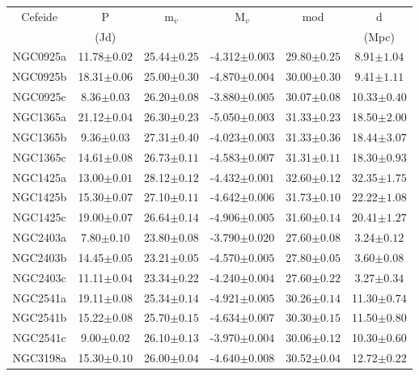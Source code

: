 \documentclass{article}
\numberwithin{equation}{subsection}
\begin{document}
\newpage
{}
\vspace*{\fill}
\begin{table}[h]
\begin{tabular}{cccccc}
\hline\hline
Cefeide  & P          & m$_v$          & M$_v$            & mod            & d        \\ 
 & (Jd) & & & & (Mpc) \\
 \hline
NGC0925a & 11.78$\pm0.02$ & 25.44$\pm0.25$ & -4.312$\pm0.003$ & 29.80$\pm0.25$ & 8.91$\pm1.04$  \\
NGC0925b & 18.31$\pm0.06$ & 25.00$\pm0.30$ & -4.870$\pm0.004$ & 30.00$\pm0.30$ & 9.41$\pm1.11$  \\
NGC0925c & 8.36$\pm0.03$  & 26.20$\pm0.08$ & -3.880$\pm0.005$ & 30.07$\pm0.08$ & 10.33$\pm0.40$ \\
NGC1365a & 21.12$\pm0.04$ & 26.30$\pm0.23$ & -5.050$\pm0.003$ & 31.33$\pm0.23$ & 18.50$\pm2.00$ \\
NGC1365b & 9.36$\pm0.03$  & 27.31$\pm0.40$ & -4.023$\pm0.003$ & 31.33$\pm0.36$ & 18.44$\pm3.07$ \\
NGC1365c & 14.61$\pm0.08$ & 26.73$\pm0.11$ & -4.583$\pm0.007$ & 31.31$\pm0.11$ & 18.30$\pm0.93$ \\
NGC1425a & 13.00$\pm0.01$ & 28.12$\pm0.12$ & -4.432$\pm0.001$ & 32.60$\pm0.12$ & 32.35$\pm1.75$ \\
NGC1425b & 15.30$\pm0.07$ & 27.10$\pm0.11$ & -4.642$\pm0.006$ & 31.73$\pm0.10$ & 22.22$\pm1.08$ \\
NGC1425c & 19.00$\pm0.07$ & 26.64$\pm0.14$ & -4.906$\pm0.005$ & 31.60$\pm0.14$ & 20.41$\pm1.27$ \\
NGC2403a & 7.80$\pm0.10$  & 23.80$\pm0.08$ & -3.790$\pm0.020$  & 27.60$\pm0.08$ & 3.24$\pm0.12$  \\
NGC2403b & 14.45$\pm0.05$ & 23.21$\pm0.05$ & -4.570$\pm0.005$ & 27.80$\pm0.05$ & 3.60$\pm0.08$  \\
NGC2403c & 11.11$\pm0.04$ & 23.34$\pm0.22$ & -4.240$\pm0.004$ & 27.60$\pm0.22$ & 3.27$\pm0.34$  \\
NGC2541a & 19.11$\pm0.08$ & 25.34$\pm0.14$ & -4.921$\pm0.005$ & 30.26$\pm0.14$ & 11.30$\pm0.74$ \\
NGC2541b & 15.22$\pm0.08$ & 25.70$\pm0.15$ & -4.634$\pm0.007$ & 30.30$\pm0.15$ & 11.50$\pm0.80$ \\
NGC2541c & 9.00$\pm0.02$  & 26.10$\pm0.13$ & -3.970$\pm0.004$ & 30.06$\pm0.12$ & 10.30$\pm0.60$ \\
NGC3198a & 15.30$\pm0.10$ & 26.00$\pm0.04$ & -4.640$\pm0.008$ & 30.52$\pm0.04$ & 12.72$\pm0.22$ \\

\end{tabular}
\end{table}
\end{document}
